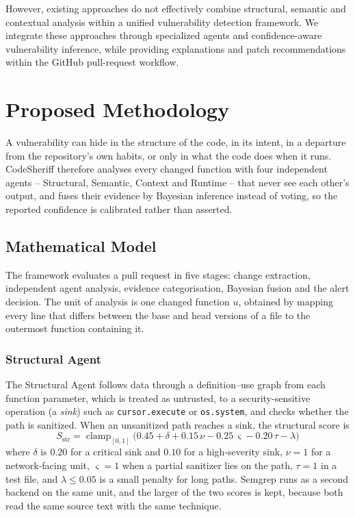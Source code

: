 \documentclass[conference]{IEEEtran}
\begin{document}
However, existing approaches do not effectively combine structural, semantic and contextual analysis within a unified vulnerability detection framework. We integrate these approaches through specialized agents and confidence-aware vulnerability inference, while providing explanations and patch recommendations within the GitHub pull-request workflow.

\section{Proposed Methodology} \label{PS}

A vulnerability can hide in the structure of the code, in its intent, in a
departure from the repository's own habits, or only in what the code does
when it runs. CodeSheriff therefore analyses every changed function with
four independent agents -- Structural, Semantic, Context and Runtime --
that never see each other's output, and fuses their evidence by Bayesian
inference instead of voting, so the reported confidence is calibrated
rather than asserted.

\subsection{Mathematical Model}

The framework evaluates a pull request in five stages: change extraction,
independent agent analysis, evidence categorisation, Bayesian fusion and
the alert decision. The unit of analysis is one changed function $u$,
obtained by mapping every line that differs between the base and head
versions of a file to the outermost function containing it.

\subsubsection{Structural Agent}
The Structural Agent follows data through a definition--use graph from each
function parameter, which is treated as untrusted, to a security-sensitive
operation (a \emph{sink}) such as \texttt{cursor.execute} or
\texttt{os.system}, and checks whether the path is sanitized. When an
unsanitized path reaches a sink, the structural score is
\begin{equation}
S_{\mathrm{str}}=\operatorname{clamp}_{[0,1]}\bigl(0.45+\delta+0.15\,\nu-0.25\,\varsigma-0.20\,\tau-\lambda\bigr)
\label{eq:str}
\end{equation}
where $\delta$ is $0.20$ for a critical sink and $0.10$ for a high-severity
sink, $\nu=1$ for a network-facing unit, $\varsigma=1$ when a partial
sanitizer lies on the path, $\tau=1$ in a test file, and $\lambda\le0.05$
is a small penalty for long paths. Semgrep runs as a second backend on the
same unit, and the larger of the two scores is kept, because both read the
same source text with the same technique.
\end{document}
